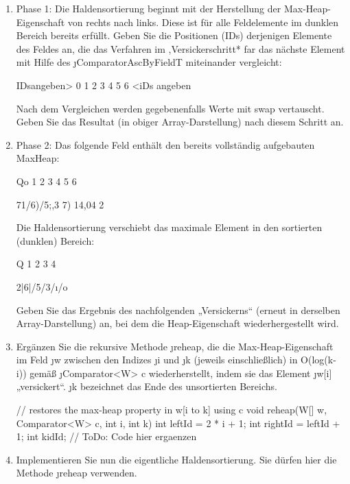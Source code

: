 \documentclass{bschlangaul-aufgabe}
\begin{document}
\begin{enumerate}


\item Phase 1: Die Haldensortierung beginnt mit der Herstellung der
Max-Heap-Eigenschaft von rechts nach links. Diese ist für alle
Feldelemente im dunklen Bereich bereits erfüllt. Geben Sie die
Positionen (IDs) derjenigen Elemente des Feldes an, die das Verfahren im
,Versickerschritt* far das nächste Element mit Hilfe des
\j{ComparatorAscByFieldT} miteinander vergleicht:

IDsangeben> 0 1 2 3 4 5 6 <iDs angeben

Nach dem Vergleichen werden gegebenenfalls Werte mit swap vertauscht.
Geben Sie das Resultat (in obiger Array-Darstellung) nach diesem Schritt
an.


\item Phase 2: Das folgende Feld enthält den bereits vollständig
aufgebauten MaxHeap:

Qo 1 2 3 4 5 6

71/6)/5;,3 7) 14,04 2

Die Haldensortierung verschiebt das maximale Element in den sortierten
(dunklen) Bereich:

Q 1 2 3 4

2|6|/5/3/ı/o

Geben Sie das Ergebnis des nachfolgenden „Versickerns“ (erneut in
derselben Array-Darstellung) an, bei dem die Heap-Eigenschaft
wiederhergestellt wird.


\item Ergänzen Sie die rekursive Methode \j{reheap}, die die
Max-Heap-Eigenschaft im Feld \j{w} zwischen den Indizes \j{i} und \j{k}
(jeweils einschließlich) in O(log(k-i)) gemäß \j{Comparator<W> c}
wiederherstellt, indem sie das Element \j{w[i]} „versickert“. \j{k}
bezeichnet das Ende des unsortierten Bereichs.

\begin{bJavaAngabe}
// restores the max-heap property in w[i to k] using c
void reheap(W[] w, Comparator<W> c, int i, int k) {
  int leftId = 2 * i + 1;
  int rightId = leftId + 1;
  int kidId;
  // ToDo: Code hier ergaenzen
}
\end{bJavaAngabe}


\item Implementieren Sie nun die eigentliche Haldensortierung. Sie
dürfen hier die Methode \j{reheap} verwenden.


\end{enumerate}
\end{document}
